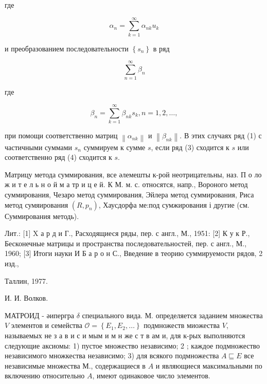 \documentclass[10pt]{article}
\begin{document}
где



\[

\alpha_{n}=\sum_{k=1}^{\infty} \alpha_{n k} u_{k}

\]



и преобразованием последовательности $\left\{s_{n}\right\}$ в ряд



\[

\sum_{n=1}^{\infty} \beta_{n}

\]



где



\[

\beta_{n}=\sum_{k=1}^{\infty} \beta_{n k} s_{k}, n=1,2, \ldots,

\]



при помощи соответственно матриц $\left\|\alpha_{n k}\right\|$ и $\left\|\beta_{n k}\right\|$. В этих случаях ряд (1) с частичными суммами $s_{n}$ суммируем к сумме $s$, если ряд (3) сходится к $s$ или соответственно ряд (4) сходится к $s$.



Матрицу метода суммирования, все әлемешты к-рой неотрицательны, наз. П о ло ж и т е л ь н о й м а тр и ц е й. К М. м. с. относятся, напр., Вороного метод суммирования, Чезаро метод суммирования, Эйлера метод суммирования, Риса метод сумяирования $\left(R, p_{n}\right)$, Хаусдорфа ме:под сумжирования і другие (см. Суммирования методь).



Лит.: [1] X а р д и Г., Расходящиеся ряды, пер. с англ., М., 1951: [2] К у к Р., Бесконечные матрицы и пространства последовательностей, пер. с англ., М., 1960; [3] Итоги науки И Б а р о н С., Введение в теорию суммируемости рядов, 2 изд.,

Таллин, 1977.

И. И. Волков.



МАТРОИД - әипергра $\delta$ специального вида. М. определяется заданием множества $V$ элементов и семейства $\mathscr{O}=\left\{E_{1}, E_{2}, \ldots\right\}$ подмножеств миожества $V$, называемых не з а в и с и мым и м н же с т в ам и, для к-рых выполняются следующие аксиомы: 1) пустое множество независимо; 2 ; каждое подмножество независимого множкества независимо; 3) для всякого подмножества $A \sqsubseteq E$ все независимые множества М., содержащиеся в $A$ и являющиеся максимальными по включению относительно $A$, имеют одинаковое число элементов.
\end{document}

